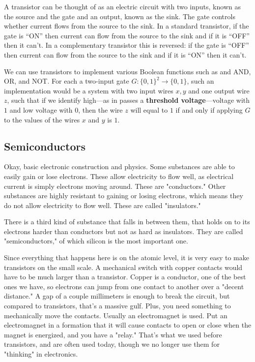   A transistor can be thought of as an electric circuit with two inputs, known as the source and the gate and an output, known as the sink. The gate controls whether current flows from the source to the sink. In a standard transistor, if the gate is “ON” then current can flow from the source to the sink and if it is “OFF” then it can’t. In a complementary transistor this is reversed: if the gate is “OFF” then current can flow from the source to the sink and if it is “ON” then it can’t. 

  We can use transistors to implement various Boolean functions such as and AND, OR, and NOT. For each a two-input gate $G: \{0,1\}^2 \longrightarrow \{0,1\}$, such an implementation would be a system with two input wires $x, y$ and one output wire $z$, such that if we identify high---as in passes a \textbf{threshold voltage}---voltage with $1$ and low voltage with $0$, then the wire $z$ will equal to $1$ if and only if applying $G$ to the values of the wires $x$ and $y$ is $1$. 

\subsection{Semiconductors}

  Okay, basic electronic construction and physics. Some substances are able to easily gain or lose electrons. These allow electricity to flow well, as electrical current is simply electrons moving around. These are "conductors." Other substances are highly resistant to gaining or losing electrons, which means they do not allow electricity to flow well. These are called "insulators."

  There is a third kind of substance that falls in between them, that holds on to its electrons harder than conductors but not as hard as insulators. They are called "semiconductors," of which silicon is the most important one. 

  Since everything that happens here is on the atomic level, it is very easy to make transistors on the small scale. A mechanical switch with copper contacts would have to be much larger than a transistor. Copper is a conductor, one of the best ones we have, so electrons can jump from one contact to another over a "decent distance." A gap of a couple millimeters is enough to break the circuit, but compared to transistors, that's a massive gulf. Plus, you need something to mechanically move the contacts. Usually an electromagnet is used. Put an electromagnet in a formation that it will cause contacts to open or close when the magnet is energized, and you have a "relay." That's what we used before transistors, and are often used today, though we no longer use them for "thinking" in electronics.

